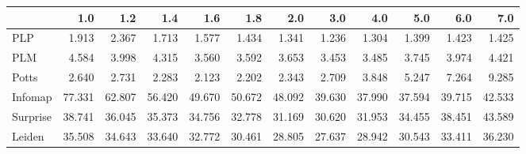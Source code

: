 \begin{tabular}{lrrrrrrrrrrr}
\toprule
{} &    1.0 &    1.2 &    1.4 &    1.6 &    1.8 &    2.0 &    3.0 &    4.0 &    5.0 &    6.0 &    7.0 \\
\midrule
PLP      &  1.913 &  2.367 &  1.713 &  1.577 &  1.434 &  1.341 &  1.236 &  1.304 &  1.399 &  1.423 &  1.425 \\
PLM      &  4.584 &  3.998 &  4.315 &  3.560 &  3.592 &  3.653 &  3.453 &  3.485 &  3.745 &  3.974 &  4.421 \\
Potts    &  2.640 &  2.731 &  2.283 &  2.123 &  2.202 &  2.343 &  2.709 &  3.848 &  5.247 &  7.264 &  9.285 \\
Infomap  & 77.331 & 62.807 & 56.420 & 49.670 & 50.672 & 48.092 & 39.630 & 37.990 & 37.594 & 39.715 & 42.533 \\
Surprise & 38.741 & 36.045 & 35.373 & 34.756 & 32.778 & 31.169 & 30.620 & 31.953 & 34.455 & 38.451 & 43.589 \\
Leiden   & 35.508 & 34.643 & 33.640 & 32.772 & 30.461 & 28.805 & 27.637 & 28.942 & 30.543 & 33.411 & 36.230 \\
\bottomrule
\end{tabular}

